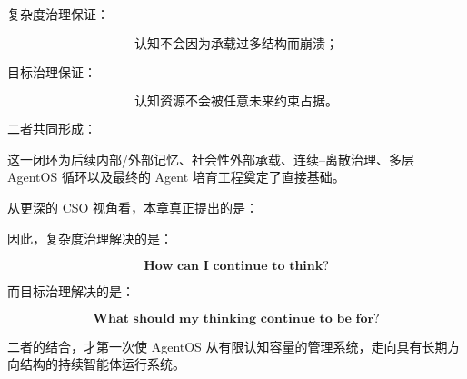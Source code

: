 复杂度治理保证：

\[
\text{认知不会因为承载过多结构而崩溃；}
\]

目标治理保证：

\[
\text{认知资源不会被任意未来约束占据。}
\]

二者共同形成：

\begin{statementbox}
\centering
{}
\end{statementbox}

这一闭环为后续内部/外部记忆、社会性外部承载、连续--离散治理、多层 AgentOS 循环以及最终的 Agent 培育工程奠定了直接基础。

从更深的 CSO 视角看，本章真正提出的是：

\begin{statementbox}
\centering
{}
\end{statementbox}

因此，复杂度治理解决的是：

\[
\boxed{
\textbf{How can I continue to think?}
}
\]

而目标治理解决的是：

\[
\boxed{
\textbf{What should my thinking continue to be for?}
}
\]

二者的结合，才第一次使 AgentOS 从有限认知容量的管理系统，走向具有长期方向结构的持续智能体运行系统。
